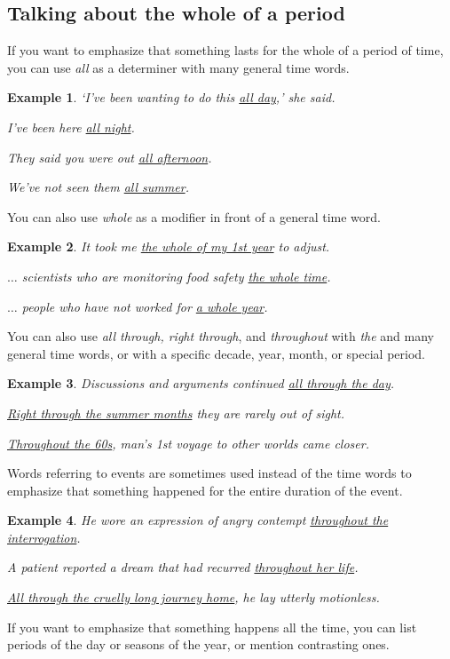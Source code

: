 \documentclass[oneside]{book}
\numberwithin{equation}{section}
\newtheorem{example}{Example}[section]
\begin{document}
\subsection{Talking about the whole of a period}
\noindent{} If you want to emphasize that something lasts for the whole of a period of time, you can use \textit{all} as a determiner with many general time words.
\begin{example}
    `I've been wanting to do this \underline{all day},' she said.
    
    I've been here \underline{all night}.
    
    They said you were out \underline{all afternoon}.
    
    We've not seen them \underline{all summer}.
\end{example}
You can also use \textit{whole} as a modifier in front of a general time word.
\begin{example}
    It took me \underline{the whole of my 1st year} to adjust.
    
    $\ldots$ scientists who are monitoring food safety \underline{the whole time}.
    
    $\ldots$ people who have not worked for \underline{a whole year}.
\end{example}
You can also use \textit{all through, right through}, and \textit{throughout} with \textit{the} and many general time words, or with a specific decade, year, month, or special period.
\begin{example}
    Discussions and arguments continued \underline{all through the day}.
    
    \underline{Right through the summer months} they are rarely out of sight.
    
    \underline{Throughout the 60s}, man's 1st voyage to other worlds came closer.
\end{example}
Words referring to events are sometimes used instead of the time words to emphasize that something happened for the entire duration of the event.
\begin{example}
    He wore an expression of angry contempt \underline{throughout the interrogation}.
    
    A patient reported a dream that had recurred \underline{throughout her life}.
    
    \underline{All through the cruelly long journey home}, he lay utterly motionless.
\end{example}
%
\noindent{} If you want to emphasize that something happens all the time, you can list periods of the day or seasons of the year, or mention contrasting ones.
\end{document}
